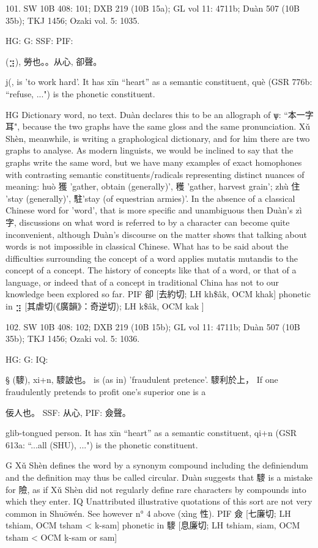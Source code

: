 101. SW 10B 408: 101; DXB 219 (10B 15a); GL vol 11: 4711b; Duàn 507 (10B 35b); TKJ 1456; Ozaki vol. 5: 1035.


HG:
G: SSF: PIF:

(⣲),
勞也。。从心,
卻聲。

j(,
is 'to work hard'.
It has xīn ``heart'' as a semantic constituent,
què (GSR 776b: ``refuse, ...") is the phonetic constituent.



HG Dictionary word, no text. Duàn declares this to be an allograph of ѱ: ``本一字耳", because the two graphs have the same gloss and the same pronunciation. Xǔ Shèn, meanwhile, is writing a graphological dictionary, and for him there are two graphs to analyse. As modern linguists, we would be inclined to say that the graphs write the same word, but we have many examples of exact homophones with contrasting semantic constituents/radicals representing distinct nuances of meaning: huò 獲 'gather, obtain (generally)', 穫 'gather, harvest grain'; zhù 住 'stay (generally)', 駐'stay (of equestrian armies)'.
    In the absence of a classical Chinese word for 'word', that is more specific and unambiguous then Duàn's zì 字, discussions on what word is referred to by a character can become quite inconvenient, although Duàn's discourse on the matter shows that talking about words is not impossible in classical Chinese. What has to be said about the difficulties surrounding the concept of a word applies mutatis mutandis to the concept of a concept. The history of concepts like that of a word, or that of a language, or indeed that of a concept in traditional China has not to our knowledge been explored so far.
PIF 卻 [去約切; LH kh\$âk, OCM khak] phonetic in ⣲ [其虐切(《廣韻》：奇逆切); LH k\$âk, OCM kak ]


102. SW 10B 408: 102; DXB 219 (10B 15b); GL vol 11: 4711b; Duàn 507 (10B 35b); TKJ 1456; Ozaki vol. 5: 1036.


HG:
G:
IQ:

§ (䮮),	xi+n,
䮮詖也。	is (as in) 'fraudulent pretence'.
䮮利於上， If one fraudulently pretends to profit one's superior one is a

佞人也。
SSF: 从心,
PIF: 僉聲。

glib-tongued person.
It has xīn ``heart'' as a semantic constituent,
qi+n (GSR 613a: ``...all (SHU), ...") is the phonetic constituent.

G	Xǔ Shèn defines the word by a synonym compound including the definiendum and the definition may thus be called circular.
Duàn suggests that 䮮 is a mistake for 險, as if Xǔ Shèn did not regularly define rare
characters by compounds into which they enter.
IQ	Unattributed illustrative quotations of this sort are not very common in Shuōwén. See however n° 4 above (xìng 性).
PIF     僉 [七廉切; LH tshiam, OCM tsham < k-sam] phonetic in 䮮 [息廉切; LH tshiam, siam, OCM tsham < OCM k-sam or sam]



